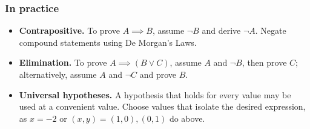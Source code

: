 \subsubsection*{In practice}
\begin{itemize}
    \item \textbf{Contrapositive.} To prove $A\implies B$, assume $\neg B$
    and derive $\neg A$. Negate compound statements using De Morgan's Laws.
    \item \textbf{Elimination.} To prove $A\implies(B\vee C)$, assume $A$
    and $\neg B$, then prove $C$; alternatively, assume $A$ and $\neg C$
    and prove $B$.
    \item \textbf{Universal hypotheses.} A hypothesis that holds for every
    value may be used at a convenient value. Choose values that isolate the
    desired expression, as $x=-2$ or $(x,y)=(1,0),(0,1)$ do above.
\end{itemize}
